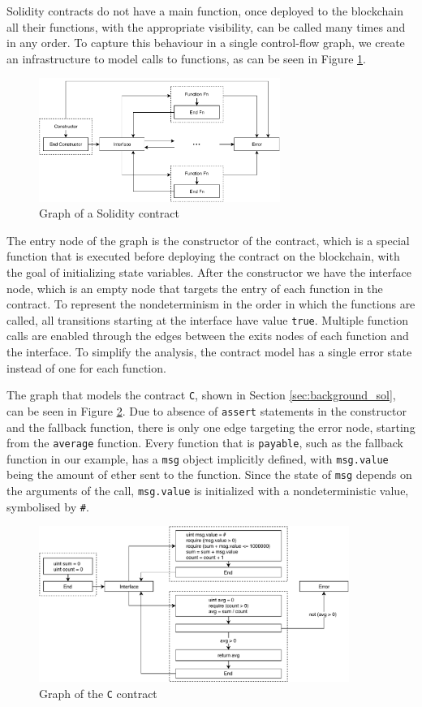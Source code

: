 Solidity contracts do not have a main function, once deployed to the blockchain all their functions, with the appropriate visibility, can be called many times and in any order. To capture this behaviour in a single control-flow graph, we create an infrastructure to model calls to functions, as can be seen in Figure \ref{fig:cfg_contract-general}.

\begin{figure}[ht]
	\centering
	\includegraphics[width=0.7\textwidth]{images/contract-general}
	\caption{Graph of a Solidity contract}
	\label{fig:cfg_contract-general}
\end{figure}

The entry node of the graph is the constructor of the contract, which is a special function that is executed before deploying the contract on the blockchain, with the goal of initializing state variables. After the constructor we have the interface node, which is an empty node that targets the entry of each function in the contract. To represent the nondeterminism in the order in which the functions are called, all transitions starting at the interface have value \texttt{true}. Multiple function calls are enabled through the edges between the exits nodes of each function and the interface. To simplify the analysis, the contract model has a single error state instead of one for each function. 

The graph that models the contract \texttt{C}, shown in Section \ref{sec:background_sol}, can be seen in Figure \ref{fig:cfg_contract-c}. Due to absence of \texttt{assert} statements in the constructor and the fallback function, there is only one edge targeting the error node, starting from the \texttt{average} function. Every function that is \texttt{payable}, such as the fallback function in our example, has a \texttt{msg} object implicitly defined, with \texttt{msg.value} being the amount of ether sent to the function. Since the state of \texttt{msg} depends on the arguments of the call, \texttt{msg.value} is initialized with a nondeterministic value, symbolised by \texttt{\#}.

\begin{figure}[ht]
	\centering
	\includegraphics[width=0.9\textwidth]{images/contract-c}
	\caption{Graph of the \texttt{C} contract}
	\label{fig:cfg_contract-c}
\end{figure}
